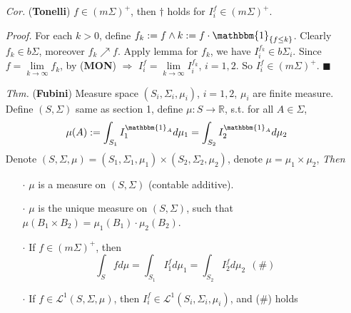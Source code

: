 \documentclass[a4paper,12pt,twoside]{book}
\begin{document}
\begin{itemize}
	\item[\textit{Cor.}] (\textbf{Tonelli}) $f\in (m\Sigma)^{+}$, then $\dagger$ holds for $I_i^{f}\in (m\Sigma)^+$.

	\item[\textit{Proof. }] For each $k> 0$, define $f_k:=f\wedge k:=f\cdot \mathbbm{1}_{\{f\leq k\}}$. Clearly $f_k \in b\Sigma$, moreover $f_k \nearrow f$. \newline
	Apply lemma for $f_k$, we have $I_i^{f_k} \in b\Sigma_i$.\newline
	Since $f=\lim\limits_{k\rightarrow\infty}f_k$, by (\textbf{MON}) $\Rightarrow$ $I_i^f = \lim\limits_{k\rightarrow\infty}I_i^{f_k}$, $i=1,2$. So $I_i^{f}\in (m\Sigma)^+$. $\blacksquare$


	\item[\textit{Thm.}] (\textbf{Fubini}) Measure space $(S_i, \Sigma_i, \mu_i)$, $i=1,2$, $\mu_i$ are finite measure. Define $(S,\Sigma)$ same as section 1, define $\mu: S\to \mathbb{R}$, s.t. for all $A\in \Sigma$,
	\begin{equation}
		\mu(A):=\int_{S_1} I^{\mathbbm{1}_{A}}_1 d\mu_1 = \int_{S_2} I^{\mathbbm{1}_{A}}_2 d\mu_2
	\end{equation}
	Denote $(S,\Sigma, \mu)=(S_1,\Sigma_1, \mu_1)\times(S_2,\Sigma_2, \mu_2)$, denote $\mu = \mu_1 \times \mu_2$, \newline
	\textit{Then}
	\begin{itemize}
		\item[$\cdot$] $\mu$ is a measure on $(S, \Sigma)$ (contable additive).
		\item[$\cdot$] $\mu$ is the unique measure on $(S, \Sigma)$, such that $\mu(B_1 \times B_2)=\mu_1(B_1)\cdot \mu_2(B_2)$.
		\item[$\cdot$] If $f\in (m\Sigma)^+$, then
		\begin{equation}
			\int_S fd\mu=\int_{S_1} I_1^fd\mu_1=\int_{S_2} I_2^fd\mu_2~~(\#)
		\end{equation}
		\item[$\cdot$] If $f\in \mathcal{L}^1(S,\Sigma,\mu)$, then $I_i^f\in \mathcal{L}^1(S_i, \Sigma_i, \mu_i)$, and (\#) holds
	\end{itemize}


\end{itemize}
\end{document}
